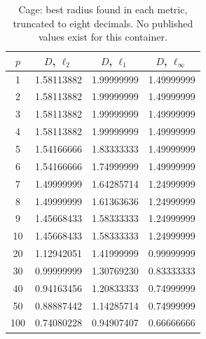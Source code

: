 \begin{table}[t]
  \centering
  \caption{Cage: best radius found in each metric, truncated to eight decimals. No published values exist for this container.}
  \label{tab:cage}
  \begin{tabular}{cccc}
    \hline
    $p$ & $D$, $\ell_2$ & $D$, $\ell_1$ & $D$, $\ell_\infty$ \\
    \hline
    1 & 1.58113882 & 1.99999999 & 1.49999999 \\
    2 & 1.58113882 & 1.99999999 & 1.49999999 \\
    3 & 1.58113882 & 1.99999999 & 1.49999999 \\
    4 & 1.58113882 & 1.99999999 & 1.49999999 \\
    5 & 1.54166666 & 1.83333333 & 1.49999999 \\
    6 & 1.54166666 & 1.74999999 & 1.49999999 \\
    7 & 1.49999999 & 1.64285714 & 1.24999999 \\
    8 & 1.49999999 & 1.61363636 & 1.24999999 \\
    9 & 1.45668433 & 1.58333333 & 1.24999999 \\
    10 & 1.45668433 & 1.58333333 & 1.24999999 \\
    20 & 1.12942051 & 1.41999999 & 0.99999999 \\
    30 & 0.99999999 & 1.30769230 & 0.83333333 \\
    40 & 0.94163456 & 1.20833333 & 0.74999999 \\
    50 & 0.88887442 & 1.14285714 & 0.74999999 \\
    100 & 0.74080228 & 0.94907407 & 0.66666666 \\
    \hline
  \end{tabular}
\end{table}
